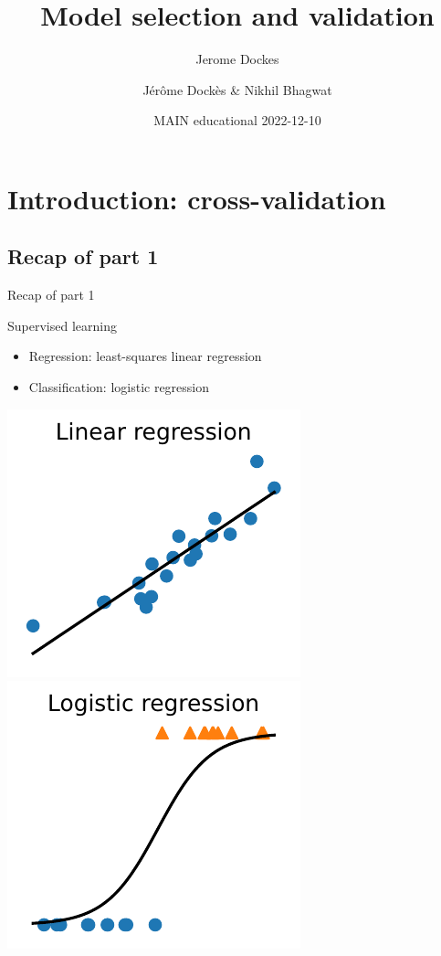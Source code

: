 \documentclass[presentation,mathserif,table]{beamer}
\author{Jerome Dockes}
\date{}
\title{Model selection and validation}
\author{Jérôme Dockès \& Nikhil Bhagwat}
\date{MAIN educational 2022-12-10}
\begin{document}
\maketitle
\section{Introduction: cross-validation}
\label{sec:org973c5fd}
\subsection{Recap of part 1}
\label{sec:orgd2a5edb}
\begin{frame}[label={sec:org58aa38a}]{Recap of part 1}
\begin{block}{Supervised learning}
\begin{itemize}
\item Regression: least-squares linear regression
\item Classification: logistic regression
\end{itemize}
\includegraphics[height=.4 \textheight]{figures/generated/linear_regression_1d/linear_regression.pdf}
\includegraphics[height=.4 \textheight]{figures/generated/logistic_regression_1d/logistic_regression.pdf}
\end{block}
\end{frame}
\end{document}
